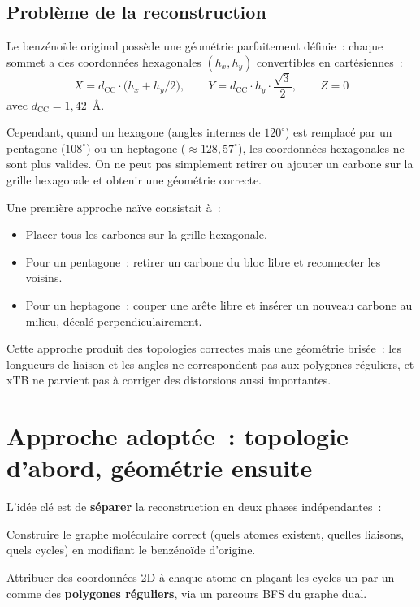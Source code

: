 \documentclass[12pt,a4paper]{article}
\theoremstyle{definition}
\theoremstyle{remark}
\begin{document}
\subsection{Probl\`eme de la reconstruction}

Le benz\'eno\"ide original poss\`ede une g\'eom\'etrie parfaitement
d\'efinie~: chaque sommet a des coordonn\'ees hexagonales $(h_x, h_y)$
convertibles en cart\'esiennes~:
\[
  X = d_{\text{CC}} \cdot \bigl(h_x + h_y / 2\bigr), \qquad
  Y = d_{\text{CC}} \cdot h_y \cdot \frac{\sqrt{3}}{2}, \qquad
  Z = 0
\]
avec $d_{\text{CC}} = 1{,}42$~\AA.

Cependant, quand un hexagone (angles internes de $120^\circ$)
est remplac\'e par un pentagone ($108^\circ$) ou un heptagone
($\approx 128{,}57^\circ$), les coordonn\'ees hexagonales ne sont
plus valides. On ne peut pas simplement retirer ou ajouter un carbone
sur la grille hexagonale et obtenir une g\'eom\'etrie correcte.

\begin{notebox}
Une premi\`ere approche na\"ive consistait \`a~:
\begin{itemize}[nosep]
  \item Placer tous les carbones sur la grille hexagonale.
  \item Pour un pentagone~: retirer un carbone du bloc libre et reconnecter les voisins.
  \item Pour un heptagone~: couper une ar\^ete libre et ins\'erer un nouveau carbone au milieu, d\'ecal\'e perpendiculairement.
\end{itemize}
Cette approche produit des topologies correctes mais une g\'eom\'etrie
bris\'ee~: les longueurs de liaison et les angles ne correspondent pas
aux polygones r\'eguliers, et xTB ne parvient pas \`a corriger des
distorsions aussi importantes.
\end{notebox}


\section{Approche adopt\'ee~: topologie d'abord, g\'eom\'etrie ensuite}

L'id\'ee cl\'e est de \textbf{s\'eparer} la reconstruction en deux phases
ind\'ependantes~:
\begin{description}[leftmargin=2.5cm,style=nextline]
  \item[Phase~A --- Topologie]
    Construire le graphe mol\'eculaire correct (quels atomes existent,
    quelles liaisons, quels cycles) en modifiant le benz\'eno\"ide
    d'origine.
  \item[Phase~B --- G\'eom\'etrie]
    Attribuer des coordonn\'ees 2D \`a chaque atome en pla\c{c}ant les
    cycles un par un comme des \textbf{polygones r\'eguliers}, via un
    parcours BFS du graphe dual.
\end{description}
\end{document}
